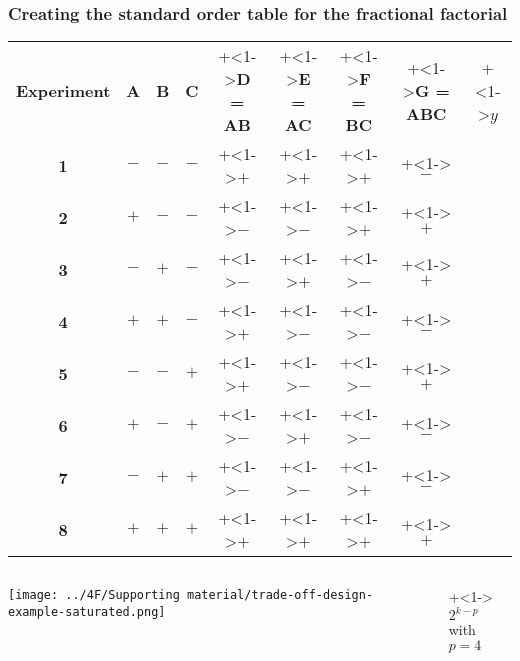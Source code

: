 \begin{frame}\frametitle{Creating the standard order table for the fractional factorial}
	\vspace{0.4cm}
	\begin{tabulary}{\linewidth}{c|ccccccc|c}
		\textbf{\relax Experiment} & \textbf{\relax A } & \textbf{\relax B} & \textbf{\relax C } & \onslide+<1->{\textbf{\relax D = AB}} & \onslide+<1->{\textbf{\relax E = AC}} & \onslide+<1->{\textbf{\relax F = BC}} & \onslide+<1->{\textbf{\relax G = ABC}} & \onslide+<1->{$y$}\\ 
		\textbf{1} & \(-\) & \(-\) & \(-\) & \onslide+<1->{\(+\)} & \onslide+<1->{\(+\)} & \onslide+<1->{\(+\)} & \onslide+<1->{\(-\)} \\
		\textbf{2} & \(+\) & \(-\) & \(-\) & \onslide+<1->{\(-\)} & \onslide+<1->{\(-\)} & \onslide+<1->{\(+\)} & \onslide+<1->{\(+\)} \\
		\textbf{3} & \(-\) & \(+\) & \(-\) & \onslide+<1->{\(-\)} & \onslide+<1->{\(+\)} & \onslide+<1->{\(-\)} & \onslide+<1->{\(+\)} \\
		\textbf{4} & \(+\) & \(+\) & \(-\) & \onslide+<1->{\(+\)} & \onslide+<1->{\(-\)} & \onslide+<1->{\(-\)} & \onslide+<1->{\(-\)} \\
		\textbf{5} & \(-\) & \(-\) & \(+\) & \onslide+<1->{\(+\)} & \onslide+<1->{\(-\)} & \onslide+<1->{\(-\)} & \onslide+<1->{\(+\)} \\
		\textbf{6} & \(+\) & \(-\) & \(+\) & \onslide+<1->{\(-\)} & \onslide+<1->{\(+\)} & \onslide+<1->{\(-\)} & \onslide+<1->{\(-\)} \\
		\textbf{7} & \(-\) & \(+\) & \(+\) & \onslide+<1->{\(-\)} & \onslide+<1->{\(-\)} & \onslide+<1->{\(+\)} & \onslide+<1->{\(-\)} \\
		\textbf{8} & \(+\) & \(+\) & \(+\) & \onslide+<1->{\(+\)} & \onslide+<1->{\(+\)} & \onslide+<1->{\(+\)} & \onslide+<1->{\(+\)} \\ 
	\end{tabulary}
	
	\vspace{0.4cm}
	
	
	\begin{columns}[T]
		
			\centerline{\texttt{[image: ../4F/Supporting material/trade-off-design-example-saturated.png]}}
		
			\onslide+<1->{
				{\huge $2^{k-p}$\\
				{\normalsize with} $p=4$}
			}
	\end{columns}
\end{frame}

